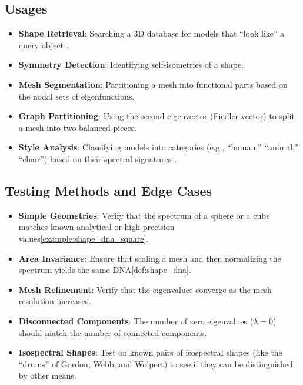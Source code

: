 \subsection{Usages}
\begin{itemize}
  \item \textbf{Shape Retrieval}: Searching a 3D database for models that ``look like'' a query object \cite{reuter2006}.
  \item \textbf{Symmetry Detection}: Identifying self-isometries of a shape.
  \item \textbf{Mesh Segmentation}: Partitioning a mesh into functional parts based on the nodal sets of eigenfunctions.
  \item \textbf{Graph Partitioning}: Using the second eigenvector (Fiedler vector) to split a mesh into two balanced pieces.
  \item \textbf{Style Analysis}: Classifying models into categories (e.g., ``human,'' ``animal,'' ``chair'') based on their spectral signatures \cite{levy2006}.
\end{itemize}

\subsection{Testing Methods and Edge Cases}
\begin{itemize}
  \item \textbf{Simple Geometries}: Verify that the spectrum of a sphere or a cube matches known analytical or high-precision values\cref{example:shape_dna_square}.
  \item \textbf{Area Invariance}: Ensure that scaling a mesh and then normalizing the spectrum yields the same DNA\cref{def:shape_dna}.
  \item \textbf{Mesh Refinement}: Verify that the eigenvalues converge as the mesh resolution increases.
  \item \textbf{Disconnected Components}: The number of zero eigenvalues ($\lambda=0$) should match the number of connected components.
  \item \textbf{Isospectral Shapes}: Test on known pairs of isospectral shapes (like the ``drums'' of Gordon, Webb, and Wolpert\cite{kac1966}) to see if they can be distinguished by other means.
\end{itemize}

